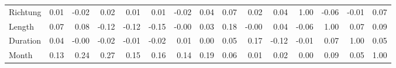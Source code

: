 \begin{tabular}{lrrrrrrrrrrrrrr}
Richtung      &       0.01 &      -0.02 &      0.02 &      0.01 &      0.01 &        -0.02 &         0.04 &     0.07 &           0.02 &    0.04 &      1.00 &   -0.06 &     -0.01 &   0.07 \\
Length        &       0.07 &       0.08 &     -0.12 &     -0.12 &     -0.15 &        -0.00 &         0.03 &     0.18 &          -0.00 &    0.04 &     -0.06 &    1.00 &      0.07 &   0.09 \\
Duration      &       0.04 &      -0.00 &     -0.02 &     -0.01 &     -0.02 &         0.01 &         0.00 &     0.05 &           0.17 &   -0.12 &     -0.01 &    0.07 &      1.00 &   0.05 \\
Month         &       0.13 &       0.24 &      0.27 &      0.15 &      0.16 &         0.14 &         0.19 &     0.06 &           0.01 &    0.02 &      0.00 &    0.09 &      0.05 &   1.00 \\
\bottomrule
\end{tabular}
